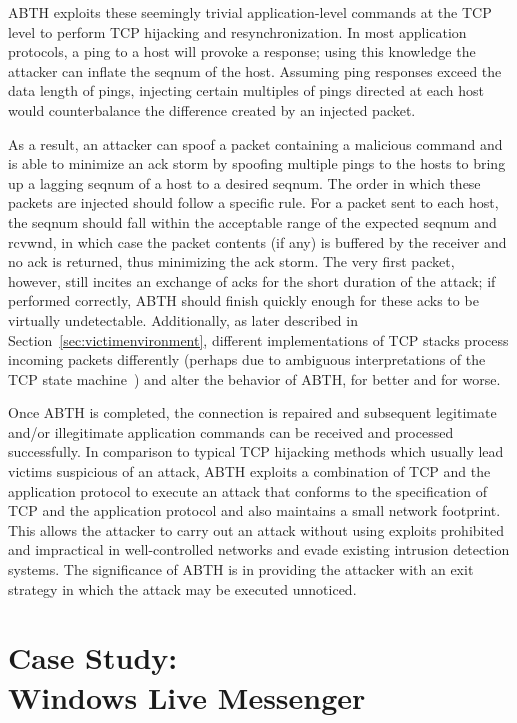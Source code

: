 \documentclass{sig-alternate}
\begin{document}
ABTH exploits these seemingly trivial application-level commands at the TCP level to perform TCP hijacking and resynchronization.
In most application protocols, a ping to a host will provoke a response; using this knowledge the attacker can inflate the seqnum of the host.
Assuming ping responses exceed the data length of pings, injecting certain multiples of pings directed at each host would counterbalance the difference created by an injected packet.

As a result, an attacker can spoof a packet containing a malicious command and is able to minimize an ack storm by spoofing multiple pings to the hosts to bring up a lagging seqnum of a host to a desired seqnum. 
The order in which these packets are injected should follow a specific rule.
For a packet sent to each host, the seqnum should fall within the acceptable range of the expected seqnum and rcvwnd, in which case the packet contents (if any) is buffered by the receiver and no ack is returned, thus minimizing the ack storm.
The very first packet, however, still incites an exchange of acks for the short duration of the attack; if performed correctly, ABTH should finish quickly enough for these acks to be virtually undetectable.
Additionally, as later described in Section~\ref{sec:victimenvironment}, different implementations of TCP stacks process incoming packets differently (perhaps due to ambiguous interpretations of the TCP state machine~\cite{zaghal:model}) and alter the behavior of ABTH, for better and for worse.

Once ABTH is completed, the connection is repaired and subsequent legitimate and/or illegitimate application commands can be received and processed successfully.
In comparison to typical TCP hijacking methods which usually lead victims suspicious of an attack, ABTH exploits a combination of TCP and the application protocol to execute an attack that conforms to the specification of TCP and the application protocol and also maintains a small network footprint.
This allows the attacker to carry out an attack without using exploits prohibited and impractical in well-controlled networks and evade existing intrusion detection systems.
The significance of ABTH is in providing the attacker with an exit strategy in which the attack may be executed unnoticed.

\section{Case Study:\\Windows Live Messenger}
\label{sec:casestudy}
\end{document}
